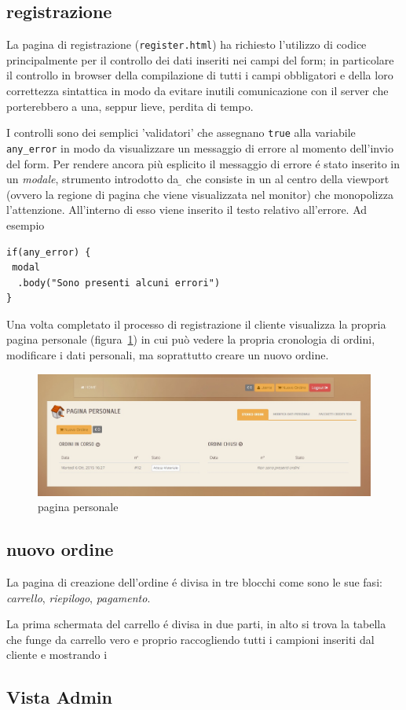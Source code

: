 \subsection*{registrazione}
\label{subs:pregistrazione}
La pagina di registrazione (\texttt{register.html}) ha richiesto l'utilizzo di codice {\js} principalmente per il controllo dei dati inseriti nei campi del form; in particolare il controllo in browser della compilazione di tutti i campi obbligatori e della loro correttezza sintattica in modo da evitare inutili comunicazione con il server che porterebbero a una, seppur lieve, perdita di tempo.

I controlli sono dei semplici 'validatori' che assegnano \texttt{true} alla variabile \texttt{any\_error} in modo da visualizzare un messaggio di errore al momento dell'invio del form. Per rendere ancora più esplicito il messaggio di errore é stato inserito in un \emph{modale}, strumento introdotto da {\b} che consiste in un {\div} al centro della viewport (ovvero la regione di pagina che viene visualizzata nel monitor) che monopolizza l'attenzione. All'interno di esso viene inserito il testo relativo all'errore. Ad esempio
\begin{verbatim}
if(any_error) {
 modal
  .body("Sono presenti alcuni errori")
}
\end{verbatim}

Una volta completato il processo di registrazione il cliente visualizza la propria pagina personale (figura~\ref{fig:ppersonale}) in cui può vedere la propria cronologia di ordini, modificare i dati personali, ma soprattutto creare un nuovo ordine.
\begin{figure}
 \includegraphics[width=1\textwidth]{images/ppersonale} 
 \caption{pagina personale}
 \label{fig:ppersonale}
\end{figure}

\subsection*{nuovo ordine}
\label{subs:pno}
La pagina di creazione dell'ordine é divisa in tre blocchi come sono le sue fasi: \emph{carrello}, \emph{riepilogo}, \emph{pagamento}.

La prima schermata del carrello é divisa in due parti, in alto si trova la tabella che funge da carrello vero e proprio raccogliendo tutti i campioni inseriti dal cliente e mostrando i 

\newpage
\subsection{Vista Admin}
\label{subs:admin}